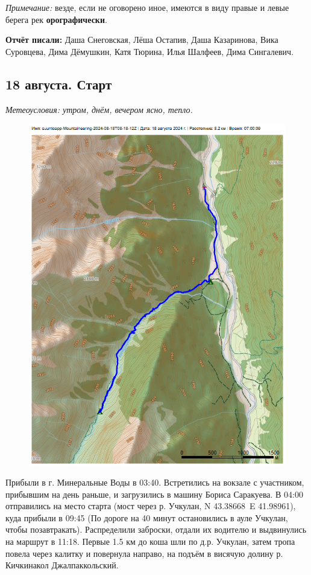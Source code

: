 \textit{Примечание:} везде, если не оговорено иное, имеются в виду правые и левые берега рек \textbf{орографически}.

\textbf{Отчёт писали:} Даша Снеговская, Лёша Остапив, Даша Казаринова, Вика Суровцева, Дима Дёмушкин, Катя Тюрина, Илья Шалфеев, Дима Сингалевич.
\subsection{18 августа. Старт}
\textit{Метеоусловия: утром, днём, вечером ясно, тепло.}

\begin{figure}[h!]
	\centering
	\includegraphics[angle=0, width=0.7\linewidth]{../pics/mini_maps/18}
	\label{fig:mini_18}
\end{figure}

Прибыли в г. Минеральные Воды в 03:40. Встретились на вокзале с участником, прибывшим на день раньше, и загрузились в машину Бориса Саракуева. В 04:00 отправились на место старта (мост через р. Учкулан, N 43.38668\degree~E 41.98961\degree), куда прибыли в 09:45 (По дороге на 40 минут остановились в ауле Учкулан, чтобы позавтракать). Распределили заброски, отдали их водителю и выдвинулись на маршрут в 11:18. Первые 1.5 км до коша шли по д.р. Учкулан, затем тропа повела через калитку и повернула направо, на подъём в висячую долину р. Кичкинакол Джалпаккольский.

